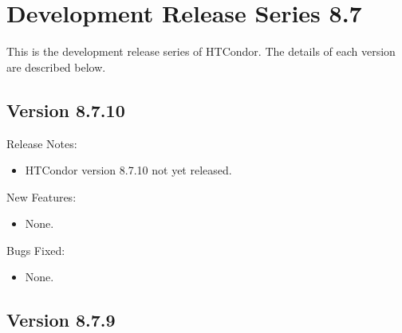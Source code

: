 
\section{Development Release Series 8.7}\label{sec:History-8-7}

This is the development release series of HTCondor.
The details of each version are described below.

\subsection*{\label{sec:New-8-7-10}Version 8.7.10}

\noindent Release Notes:

\begin{itemize}

\item HTCondor version 8.7.10 not yet released.

\end{itemize}


\noindent New Features:

\begin{itemize}

\item None.

\end{itemize}

\noindent Bugs Fixed:

\begin{itemize}

\item None.

\end{itemize}

\subsection*{\label{sec:New-8-7-9}Version 8.7.9}

